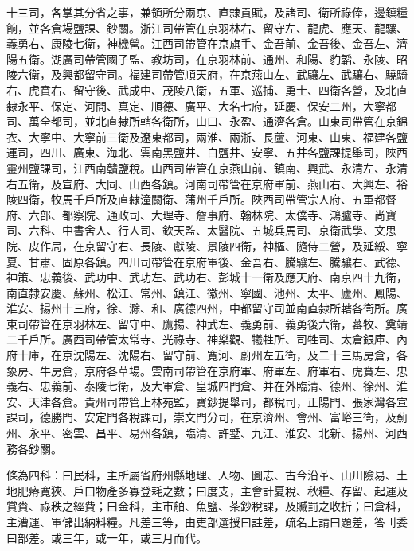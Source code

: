 十三司，各掌其分省之事，兼領所分兩京、直隸貢賦，及諸司、衛所祿俸，邊鎮糧餉，並各倉場鹽課、鈔關。浙江司帶管在京羽林右、留守左、龍虎、應天、龍驤、義勇右、康陵七衛，神機營。江西司帶管在京旗手、金吾前、金吾後、金吾左、濟陽五衛。湖廣司帶管國子監、教坊司，在京羽林前、通州、和陽、豹韜、永陵、昭陵六衛，及興都留守司。福建司帶管順天府，在京燕山左、武驤左、武驤右、驍騎右、虎賁右、留守後、武成中、茂陵八衛，五軍、巡捕、勇士、四衛各營，及北直隸永平、保定、河間、真定、順德、廣平、大名七府，延慶、保安二州，大寧都司、萬全都司，並北直隸所轄各衛所，山口、永盈、通濟各倉。山東司帶管在京錦衣、大寧中、大寧前三衛及遼東都司，兩淮、兩浙、長蘆、河東、山東、福建各鹽運司，四川、廣東、海北、雲南黑鹽井、白鹽井、安寧、五井各鹽課提舉司，陜西靈州鹽課司，江西南贛鹽稅。山西司帶管在京燕山前、鎮南、興武、永清左、永清右五衛，及宣府、大同、山西各鎮。河南司帶管在京府軍前、燕山右、大興左、裕陵四衛，牧馬千戶所及直隸潼關衛、蒲州千戶所。陜西司帶管宗人府、五軍都督府、六部、都察院、通政司、大理寺、詹事府、翰林院、太僕寺、鴻臚寺、尚寶司、六科、中書舍人、行人司、欽天監、太醫院、五城兵馬司、京衛武學、文思院、皮作局，在京留守右、長陵、獻陵、景陵四衛，神樞、隨侍二營，及延綏、寧夏、甘肅、固原各鎮。四川司帶管在京府軍後、金吾右、騰驤左、騰驤右、武德、神策、忠義後、武功中、武功左、武功右、彭城十一衛及應天府、南京四十九衛，南直隸安慶、蘇州、松江、常州、鎮江、徽州、寧國、池州、太平、廬州、鳳陽、淮安、揚州十三府，徐、滁、和、廣德四州，中都留守司並南直隸所轄各衛所。廣東司帶管在京羽林左、留守中、鷹揚、神武左、義勇前、義勇後六衛，蕃牧、奠靖二千戶所。廣西司帶管太常寺、光祿寺、神樂觀、犧牲所、司牲司、太倉銀庫、內府十庫，在京沈陽左、沈陽右、留守前、寬河、蔚州左五衛，及二十三馬房倉，各象房、牛房倉，京府各草場。雲南司帶管在京府軍、府軍左、府軍右、虎賁左、忠義右、忠義前、泰陵七衛，及大軍倉、皇城四門倉、并在外臨清、德州、徐州、淮安、天津各倉。貴州司帶管上林苑監，寶鈔提舉司，都稅司，正陽門、張家灣各宣課司，德勝門、安定門各稅課司，崇文門分司，在京濟州、會州、富峪三衛，及薊州、永平、密雲、昌平、易州各鎮，臨清、許墅、九江、淮安、北新、揚州、河西務各鈔關。

條為四科：曰民科，主所屬省府州縣地理、人物、圖志、古今沿革、山川險易、土地肥瘠寬狹、戶口物產多寡登耗之數；曰度支，主會計夏稅、秋糧、存留、起運及賞賚、祿秩之經費；曰金科，主市舶、魚鹽、茶鈔稅課，及贓罰之收折；曰倉科，主漕運、軍儲出納料糧。凡差三等，由吏部選授曰註差，疏名上請曰題差，答刂委曰部差。或三年，或一年，或三月而代。

